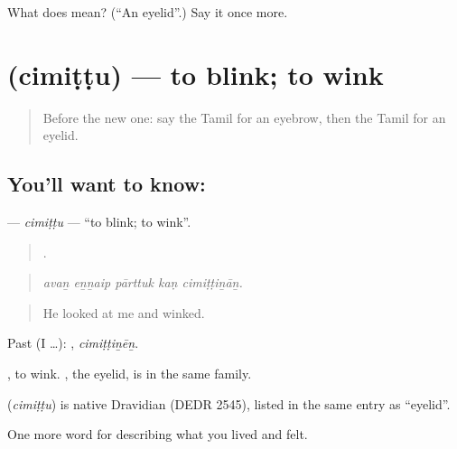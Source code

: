 \begin{tcolorbox}[breakable,colback=teal!4,colframe=teal!35!black,title={Before you move on}]
What does  mean? (\textquotedblleft{}An eyelid\textquotedblright{}.) Say it once more.
\end{tcolorbox}
\section[\texorpdfstring{\ta{சிமிட்டு} (cimiṭṭu)}{சிமிட்டு (cimiṭṭu)}]{ (cimiṭṭu) — to blink; to wink}

\label{lesson:TA-C480-cimittu}



\begin{quote}
Before the new one: say the Tamil for an eyebrow, then the Tamil for an eyelid.
\end{quote}

\subsection*{You'll want to know: }
\textbf{} — \emph{cimiṭṭu} — \textquotedblleft{}to blink; to wink\textquotedblright{}.

\begin{quote}
    .
\end{quote}

\begin{quote}
\emph{avaṉ eṉṉaip pārttuk kaṇ cimiṭṭiṉāṉ.}
\end{quote}

\begin{quote}
He looked at me and winked.
\end{quote}

Past (I …): , \emph{cimiṭṭiṉēṉ}.

 , to wink. , the eyelid, is in the same family.

\begin{cousinweb}
\textbf{} (\emph{cimiṭṭu}) is native Dravidian (DEDR 2545), listed in the same entry as  \textquotedblleft{}eyelid\textquotedblright{}.
\end{cousinweb}

\begin{grammarlens}[title={What you've built}]
One more word for describing what you lived and felt.
\end{grammarlens}


